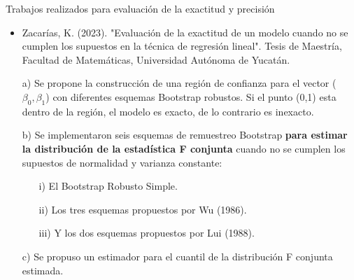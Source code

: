 \documentclass[serif, aspectratio=169]{beamer}
\begin{document}
\begin{frame}{Trabajos realizados para evaluación de la exactitud y precisión}
	
	\begin{itemize}
		\item  Zacarías, K. (2023). "Evaluación de la exactitud de un modelo cuando no se cumplen los supuestos en la técnica de regresión lineal". Tesis de Maestría, Facultad
		de Matemáticas, Universidad Autónoma de Yucatán.
	\end{itemize}
	
	
	
	\begin{itemize}
		\item [a)] Se propone la construcción de una región de confianza para el vector ($\beta_0 , \beta_{1}$) con diferentes esquemas Bootstrap robustos. Si el punto (0,1) esta dentro de la región, el modelo es exacto, de lo contrario es inexacto.
		 
		\item[ b)] Se implementaron seis esquemas de remuestreo Bootstrap \textbf{para estimar la distribución de la estadística F conjunta} cuando no se cumplen los supuestos de normalidad y varianza constante: 
		
			\begin{itemize}
				\item[ i) ] El Bootstrap Robusto Simple.
				\item[ ii)] Los tres esquemas propuestos por Wu (1986).
				\item[ iii)] Y los dos esquemas propuestos por Lui (1988).
			\end{itemize}
		
		\item[ c)] Se propuso un estimador para el cuantil de la distribución F conjunta estimada.
	\end{itemize}

	
\end{frame}
\end{document}
